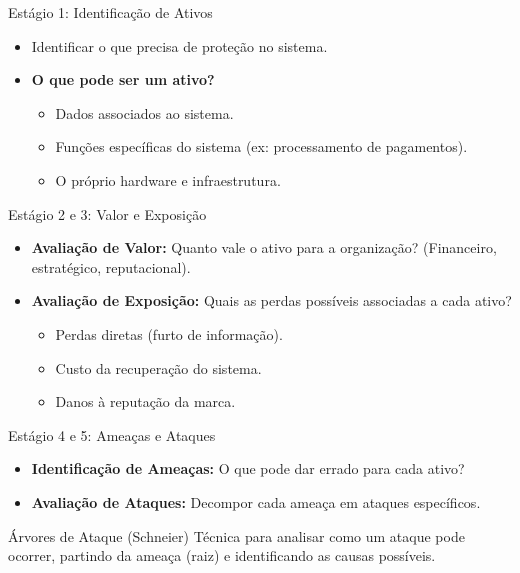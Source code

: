\documentclass[aspectratio=169]{beamer}
\begin{document}
\begin{frame}{Estágio 1: Identificação de Ativos}
    \begin{itemize}
        \item Identificar o que precisa de proteção no sistema.
        \item \textbf{O que pode ser um ativo?}
        \begin{itemize}
            \item Dados associados ao sistema.
            \item Funções específicas do sistema (ex: processamento de pagamentos).
            \item O próprio hardware e infraestrutura.
        \end{itemize}
    \end{itemize}
    \centering
\end{frame}

\begin{frame}{Estágio 2 e 3: Valor e Exposição}
    \begin{itemize}
        \item \textbf{Avaliação de Valor:} Quanto vale o ativo para a organização? (Financeiro, estratégico, reputacional).
        \item \textbf{Avaliação de Exposição:} Quais as perdas possíveis associadas a cada ativo?
        \begin{itemize}
            \item Perdas diretas (furto de informação).
            \item Custo da recuperação do sistema.
            \item Danos à reputação da marca.
        \end{itemize}
    \end{itemize}
\end{frame}

\begin{frame}{Estágio 4 e 5: Ameaças e Ataques}
    \begin{itemize}
        \item \textbf{Identificação de Ameaças:} O que pode dar errado para cada ativo?
        \item \textbf{Avaliação de Ataques:} Decompor cada ameaça em ataques específicos.
    \end{itemize}
    \begin{block}{Árvores de Ataque (Schneier)}
        Técnica para analisar como um ataque pode ocorrer, partindo da ameaça (raiz) e identificando as causas possíveis.
    \end{block}
\end{frame}
\end{document}
